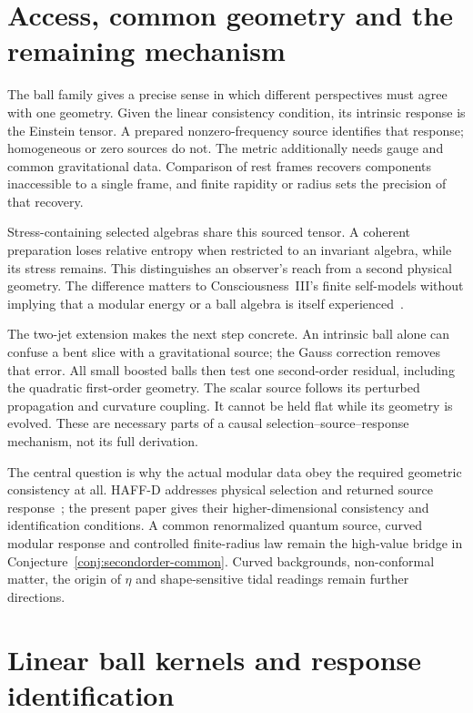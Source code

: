\documentclass[12pt]{article}
\theoremstyle{definition}
\theoremstyle{remark}
\begin{document}
\section{Access, common geometry and the remaining mechanism}
\label{sec:meaning}
\label{sec:open}

The ball family gives a precise sense in which different perspectives
must agree with one geometry. Given the linear consistency condition,
its intrinsic response is the Einstein tensor. A prepared nonzero-frequency
source identifies that response; homogeneous or zero sources do not.
The metric additionally needs gauge and common gravitational data.
Comparison of rest frames recovers components inaccessible to a single
frame, and finite rapidity or radius sets the precision of that recovery.

Stress-containing selected algebras share this sourced tensor. A coherent
preparation loses relative entropy when restricted to an invariant algebra,
while its stress remains. This distinguishes an observer's reach from a
second physical geometry. The difference matters to Consciousness~III's
finite self-models without implying that a modular energy or a ball algebra
is itself experienced~\cite{PaperIII}.

The two-jet extension makes the next step concrete. An intrinsic ball
alone can confuse a bent slice with a gravitational source; the Gauss
correction removes that error. All small boosted balls then test one
second-order residual, including the quadratic first-order geometry.
The scalar source follows its perturbed propagation and curvature coupling.
It cannot be held flat while its geometry is evolved. These are necessary
parts of a causal selection--source--response mechanism, not its full
derivation.

The central question is why the actual modular data obey the required
geometric consistency at all. HAFF-D addresses physical selection and
returned source response~\cite{HAFFD}; the present paper gives their
higher-dimensional consistency and identification conditions. A common
renormalized quantum source, curved modular response and controlled
finite-radius law remain the high-value bridge in
Conjecture~\ref{conj:secondorder-common}. Curved backgrounds,
non-conformal matter, the origin of $\eta$ and shape-sensitive tidal
readings remain further directions.

\appendix
\section{Linear ball kernels and response identification}
\label{app:linear-details}
\end{document}
